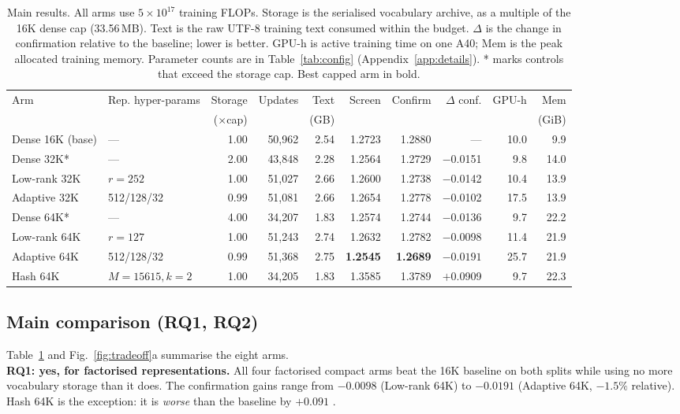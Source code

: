 \documentclass[10pt,a4paper]{article}
\newcommand{\bpb}{\text{BPB}}
\newcommand{\dd}{\Delta}
\begin{document}
\begin{table}[H]
\centering
\caption{Main results. All arms use $5\times10^{17}$ training FLOPs. Storage is the serialised
vocabulary archive, as a multiple of the 16K dense cap (33.56\,MB). Text is the raw UTF-8 training text
consumed within the budget. $\dd$ is the change in confirmation
\bpb{} relative to the baseline; lower is better. GPU-h is active training time on one A40; Mem is the
peak allocated training memory. Parameter counts are in Table~\ref{tab:config} (Appendix~\ref{app:details}). * marks controls that exceed the storage cap. Best capped arm in bold.}
\label{tab:main}
\setlength{\tabcolsep}{3.5pt}
\begin{tabular}{@{}llrrrrrrrr@{}}
\toprule
Arm & Rep. hyper-params & Storage & Updates & Text & Screen & Confirm & $\dd$ conf. & GPU-h & Mem \\
 & & ($\times$cap) & & (GB) & \bpb & \bpb & & & (GiB)\\
\midrule
Dense 16K (base) & --- & 1.00 & 50,962 & 2.54 & 1.2723 & 1.2880 & --- & 10.0 & 9.9\\
\midrule
Dense 32K* & --- & 2.00 & 43,848 & 2.28 & 1.2564 & 1.2729 & $-$0.0151 & 9.8 & 14.0\\
Low-rank 32K & $r=252$ & 1.00 & 51,027 & 2.66 & 1.2600 & 1.2738 & $-$0.0142 & 10.4 & 13.9\\
Adaptive 32K & 512/128/32 & 0.99 & 51,081 & 2.66 & 1.2654 & 1.2778 & $-$0.0102 & 17.5 & 13.9\\
\midrule
Dense 64K* & --- & 4.00 & 34,207 & 1.83 & 1.2574 & 1.2744 & $-$0.0136 & 9.7 & 22.2\\
Low-rank 64K & $r=127$ & 1.00 & 51,243 & 2.74 & 1.2632 & 1.2782 & $-$0.0098 & 11.4 & 21.9\\
Adaptive 64K & 512/128/32 & 0.99 & 51,368 & 2.75 & \textbf{1.2545} & \textbf{1.2689} & $\mathbf{-0.0191}$ & 25.7 & 21.9\\
Hash 64K & $M{=}15615,k{=}2$ & 1.00 & 34,205 & 1.83 & 1.3585 & 1.3789 & $+$0.0909 & 9.7 & 22.3\\
\bottomrule
\end{tabular}
\end{table}

\subsection{Main comparison (RQ1, RQ2)}
Table~\ref{tab:main} and Fig.~\ref{fig:tradeoff}a summarise the eight arms.\\
\textbf{RQ1: yes, for factorised representations.} All four factorised compact arms beat the 16K baseline
on both splits while using no more vocabulary storage than it does. The confirmation gains range from
$-0.0098$ (Low-rank 64K) to $-0.0191$ \bpb{} (Adaptive 64K, $-1.5\%$ relative). Hash 64K is the
exception: it is \emph{worse} than the baseline by $+0.091$ \bpb.
\end{document}

